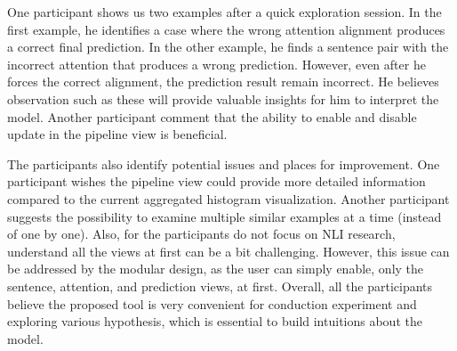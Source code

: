 One participant shows us two examples after a quick exploration session. 
In the first example, he identifies a case where the wrong attention alignment produces a correct final prediction.
%
In the other example, he finds a sentence pair with the incorrect attention that produces a wrong prediction. 
However, even after he forces the correct alignment, the prediction result remain incorrect. He believes observation such as these will provide valuable insights for him to interpret the model. 
%
Another participant comment that the ability to enable and disable update in the pipeline view is beneficial.

The participants also identify potential issues and places for improvement. 
One participant wishes the pipeline view could provide more detailed information compared to the current aggregated histogram visualization. 
Another participant suggests the possibility to examine multiple similar examples at a time (instead of one by one). 
%
Also, for the participants do not focus on NLI research, understand all the views at first can be a bit challenging. However, this issue can be addressed by the modular design, as the user can simply enable, only the sentence, attention, and prediction views, at first.
%
Overall, all the participants believe the proposed tool is very convenient for conduction experiment and exploring various hypothesis, which is essential to build intuitions about the model.



